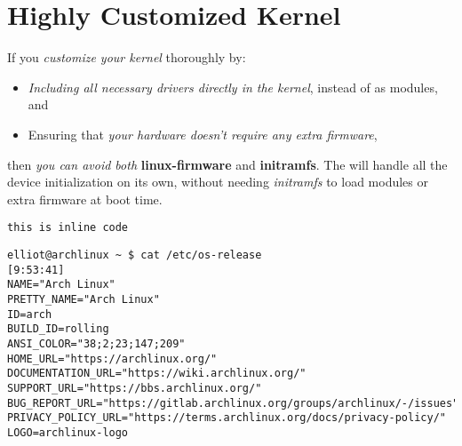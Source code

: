 
\newpage

\section{Highly Customized Kernel}
If you \textit{customize your kernel} thoroughly by:
\begin{itemize}
  \item \textit{Including all necessary drivers directly in the kernel}, instead of as modules, and
  \item Ensuring that \textit{your hardware doesn't require any extra firmware},
\end{itemize}

then \textit{you can avoid both} \textbf{linux-firmware} and \textbf{initramfs}. The {} will handle all the device initialization on its own, without needing \textit{initramfs} to load modules or extra firmware at boot time.


\texttt{\firamonofont this is inline code}
\begin{lstlisting}[caption={\smaller Sample Code}]
elliot@archlinux ~ $ cat /etc/os-release                                                     [9:53:41]
NAME="Arch Linux"
PRETTY_NAME="Arch Linux"
ID=arch
BUILD_ID=rolling
ANSI_COLOR="38;2;23;147;209"
HOME_URL="https://archlinux.org/"
DOCUMENTATION_URL="https://wiki.archlinux.org/"
SUPPORT_URL="https://bbs.archlinux.org/"
BUG_REPORT_URL="https://gitlab.archlinux.org/groups/archlinux/-/issues"
PRIVACY_POLICY_URL="https://terms.archlinux.org/docs/privacy-policy/"
LOGO=archlinux-logo
\end{lstlisting}
